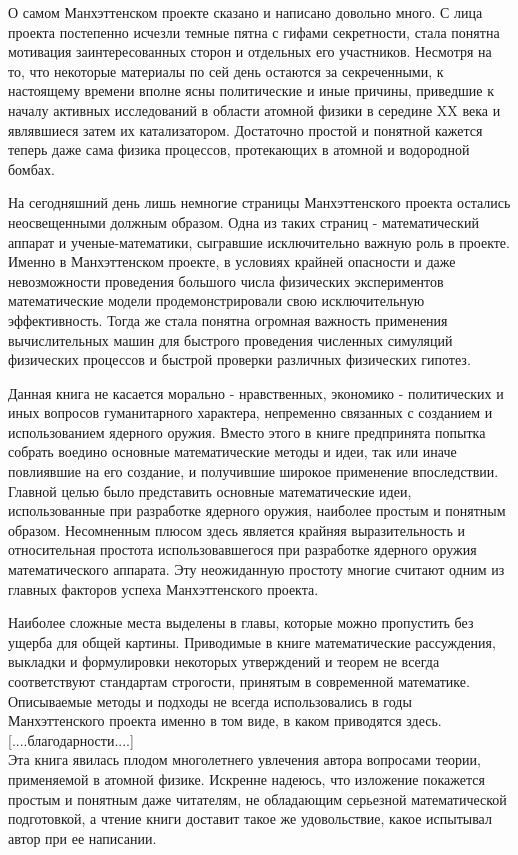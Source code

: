 О самом Манхэттенском проекте сказано и написано довольно много.
С лица проекта постепенно исчезли темные пятна с гифами секретности, стала понятна мотивация заинтересованных сторон и отдельных его участников.
Несмотря на то, что некоторые материалы по сей день остаются за секреченными, к настоящему времени вполне ясны политические и иные причины, приведшие к началу активных исследований в области атомной физики в середине XX века и являвшиеся затем их катализатором.
Достаточно простой и понятной кажется теперь даже сама физика процессов, протекающих в атомной и водородной бомбах.

На сегодняшний день лишь немногие страницы Манхэттенского проекта остались неосвещенными должным образом. 
Одна из таких страниц - математический аппарат и ученые-математики, сыгравшие исключительно важную роль в проекте.
Именно в Манхэттенском проекте, в условиях крайней опасности и даже невозможности проведения большого числа физических экспериментов математические модели продемонстрировали свою исключительную эффективность.
Тогда же стала понятна огромная важность применения вычислительных машин для быстрого проведения численных симуляций физических процессов и быстрой проверки различных физических гипотез.

Данная книга не касается морально - нравственных, экономико - политических и иных вопросов гуманитарного характера, непременно связанных с созданием и использованием ядерного оружия.
Вместо этого в книге предпринята попытка собрать воедино основные математические методы и идеи, так или иначе повлиявшие на его создание, и получившие широкое применение впоследствии.
Главной целью было представить основные математические идеи, использованные при разработке ядерного оружия, наиболее простым и понятным образом. 
Несомненным плюсом здесь является крайняя выразительность и относительная простота использовавшегося при разработке ядерного оружия математического аппарата. 
Эту неожиданную простоту многие считают одним из главных факторов успеха Манхэттенского проекта.

Наиболее сложные места выделены в главы, которые можно пропустить без ущерба для общей картины.
Приводимые в книге математические рассуждения, выкладки и формулировки некоторых утверждений и теорем не всегда соответствуют стандартам строгости, принятым в современной математике.
Описываемые методы и подходы не всегда использовались в годы Манхэттенского проекта именно в том виде, в каком приводятся здесь.
\\

[....благодарности....]
\\

Эта книга явилась плодом многолетнего увлечения автора вопросами теории, применяемой в атомной физике. 
Искренне надеюсь, что изложение покажется простым и понятным даже читателям, не обладающим серьезной математической подготовкой, а чтение книги доставит такое же удовольствие, какое испытывал автор при ее написании.


